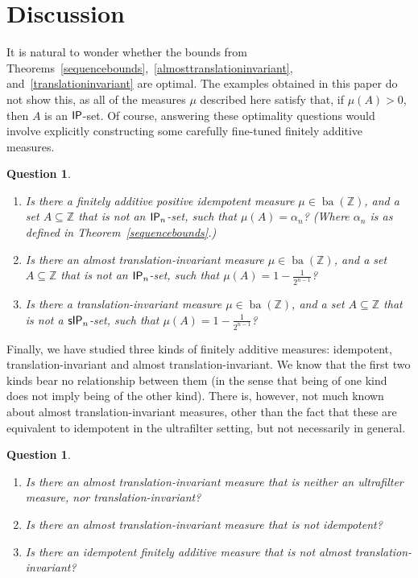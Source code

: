 \documentclass{jloganal}
\newtheorem{question}[thm]{Question}
\theoremstyle{definition}
\newcommand{\ba}{\mathop{\mathrm{ba}}}
\newcommand{\ip}{\mathnormal{\mathsf{IP}}}
\newcommand{\sip}{\mathnormal{\mathsf{sIP}}}
\begin{document}
\section{Discussion}

It is natural to wonder whether the bounds from Theorems~\ref{sequencebounds},~\ref{almosttranslationinvariant}, and~\ref{translationinvariant} are optimal. The examples obtained in this paper do not show this, as all of the measures $\mu$ described here satisfy that, if $\mu(A)>0$, then $A$ is an $\ip$-set. Of course, answering these optimality questions would involve explicitly constructing some carefully fine-tuned finitely additive measures.

\begin{question}
    \begin{enumerate}
        \item Is there a finitely additive positive idempotent measure $\mu\in\ba(\mathbb Z)$, and a set $A\subseteq\mathbb Z$ that is not an $\ip_n$-set, such that $\mu(A)=\alpha_n$? (Where $\alpha_n$ is as defined in Theorem~\ref{sequencebounds}.)
        \item Is there an almost translation-invariant measure $\mu\in\ba(\mathbb Z)$, and a set $A\subseteq\mathbb Z$ that is not an $\ip_n$-set, such that $\mu(A)=1-\frac{1}{2^{n-1}}$?
        \item Is there a translation-invariant measure $\mu\in\ba(\mathbb Z)$, and a set $A\subseteq\mathbb Z$ that is not a $\sip_n$-set, such that $\mu(A)=1-\frac{1}{2^{n-1}}$?
    \end{enumerate}
\end{question}

Finally, we have studied three kinds of finitely additive measures: idempotent, translation-invariant and almost translation-invariant. We know that the first two kinds bear no relationship between them (in the sense that being of one kind does not imply being of the other kind). There is, however, not much known about almost translation-invariant measures, other than the fact that these are equivalent to idempotent in the ultrafilter setting, but not necessarily in general.

\begin{question}
    \begin{enumerate}
        \item Is there an almost translation-invariant measure that is neither an ultrafilter measure, nor translation-invariant?
        \item Is there an almost translation-invariant measure that is not idempotent?
        \item Is there an idempotent finitely additive measure that is not almost translation-invariant?
    \end{enumerate}
\end{question}
\end{document}
